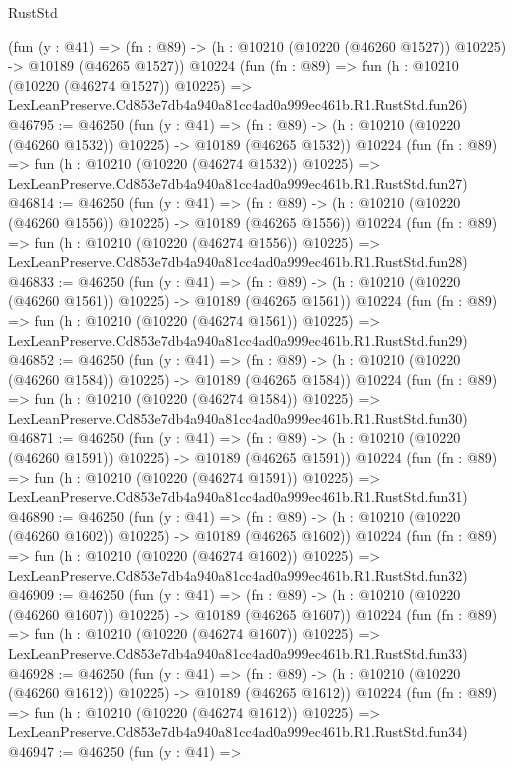 \begin{lexlean}{RustStd}
\begin{coremodule}
    (fun (y : @41) =>
    (fn : @89) -> (h : @10210 (@10220 (@46260 @1527)) @10225) -> @10189 (@46265 @1527))
    @10224
    (fun (fn : @89) =>
    fun (h : @10210 (@10220 (@46274 @1527)) @10225) =>
    LexLeanPreserve.Cd853e7db4a940a81cc4ad0a999ec461b.R1.RustStd.fun26)
@46795 := @46250
    (fun (y : @41) =>
    (fn : @89) -> (h : @10210 (@10220 (@46260 @1532)) @10225) -> @10189 (@46265 @1532))
    @10224
    (fun (fn : @89) =>
    fun (h : @10210 (@10220 (@46274 @1532)) @10225) =>
    LexLeanPreserve.Cd853e7db4a940a81cc4ad0a999ec461b.R1.RustStd.fun27)
@46814 := @46250
    (fun (y : @41) =>
    (fn : @89) -> (h : @10210 (@10220 (@46260 @1556)) @10225) -> @10189 (@46265 @1556))
    @10224
    (fun (fn : @89) =>
    fun (h : @10210 (@10220 (@46274 @1556)) @10225) =>
    LexLeanPreserve.Cd853e7db4a940a81cc4ad0a999ec461b.R1.RustStd.fun28)
@46833 := @46250
    (fun (y : @41) =>
    (fn : @89) -> (h : @10210 (@10220 (@46260 @1561)) @10225) -> @10189 (@46265 @1561))
    @10224
    (fun (fn : @89) =>
    fun (h : @10210 (@10220 (@46274 @1561)) @10225) =>
    LexLeanPreserve.Cd853e7db4a940a81cc4ad0a999ec461b.R1.RustStd.fun29)
@46852 := @46250
    (fun (y : @41) =>
    (fn : @89) -> (h : @10210 (@10220 (@46260 @1584)) @10225) -> @10189 (@46265 @1584))
    @10224
    (fun (fn : @89) =>
    fun (h : @10210 (@10220 (@46274 @1584)) @10225) =>
    LexLeanPreserve.Cd853e7db4a940a81cc4ad0a999ec461b.R1.RustStd.fun30)
@46871 := @46250
    (fun (y : @41) =>
    (fn : @89) -> (h : @10210 (@10220 (@46260 @1591)) @10225) -> @10189 (@46265 @1591))
    @10224
    (fun (fn : @89) =>
    fun (h : @10210 (@10220 (@46274 @1591)) @10225) =>
    LexLeanPreserve.Cd853e7db4a940a81cc4ad0a999ec461b.R1.RustStd.fun31)
@46890 := @46250
    (fun (y : @41) =>
    (fn : @89) -> (h : @10210 (@10220 (@46260 @1602)) @10225) -> @10189 (@46265 @1602))
    @10224
    (fun (fn : @89) =>
    fun (h : @10210 (@10220 (@46274 @1602)) @10225) =>
    LexLeanPreserve.Cd853e7db4a940a81cc4ad0a999ec461b.R1.RustStd.fun32)
@46909 := @46250
    (fun (y : @41) =>
    (fn : @89) -> (h : @10210 (@10220 (@46260 @1607)) @10225) -> @10189 (@46265 @1607))
    @10224
    (fun (fn : @89) =>
    fun (h : @10210 (@10220 (@46274 @1607)) @10225) =>
    LexLeanPreserve.Cd853e7db4a940a81cc4ad0a999ec461b.R1.RustStd.fun33)
@46928 := @46250
    (fun (y : @41) =>
    (fn : @89) -> (h : @10210 (@10220 (@46260 @1612)) @10225) -> @10189 (@46265 @1612))
    @10224
    (fun (fn : @89) =>
    fun (h : @10210 (@10220 (@46274 @1612)) @10225) =>
    LexLeanPreserve.Cd853e7db4a940a81cc4ad0a999ec461b.R1.RustStd.fun34)
@46947 := @46250
    (fun (y : @41) =>

\end{coremodule}
\end{lexlean}
